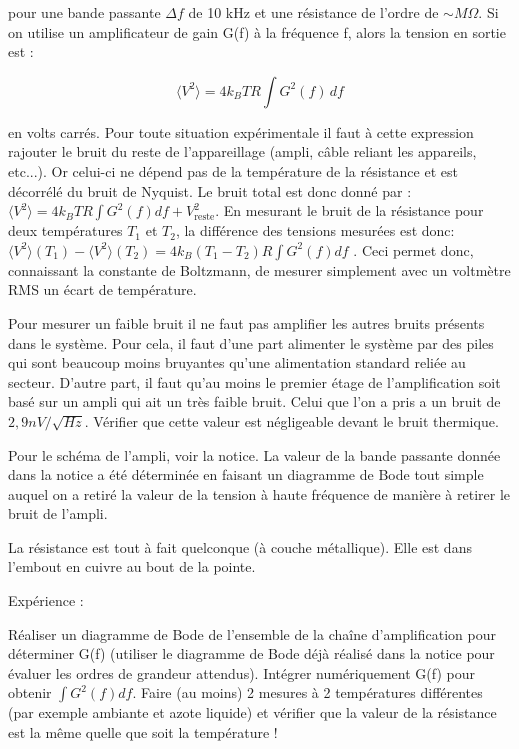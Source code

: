 \documentclass{article}%
\begin{document}
pour une bande passante $\Delta f$ de 10 kHz et une résistance de l'ordre de $\sim M\Omega$. Si on utilise un amplificateur de gain G(f) à la fréquence f, alors la tension en sortie est :

\[\langle V^2 \rangle=4k_B TR\int {G^2(f)\,{d} f}\]

en volts carrés. Pour toute situation expérimentale il faut à cette expression rajouter le bruit du reste de l'appareillage (ampli, câble reliant les appareils, etc...). Or celui-ci ne dépend pas de la température de la résistance et est décorrélé du bruit de Nyquist. Le bruit total est donc donné par : $\langle V^2\rangle = 4k_B TR\int {G^2(f) {d} f} + V_\textrm{reste}^2$. En mesurant le bruit de la résistance pour deux températures $T_1$ et $T_2$, la différence des tensions mesurées est donc: $\langle V^2 \rangle(T_1)-\langle V^2 \rangle(T_2)=4k_B (T_1-T_2)R\int {G^2(f) d f}$ . Ceci permet donc, connaissant la constante de Boltzmann, de mesurer simplement avec un voltmètre RMS un écart de température.

Pour mesurer un faible bruit il ne faut pas amplifier les autres bruits présents dans le système. Pour cela, il faut d'une part alimenter le système par des piles qui sont beaucoup moins bruyantes qu'une alimentation standard reliée au secteur. D'autre part, il faut qu'au moins le premier étage de l'amplification soit basé sur un ampli qui ait un très faible bruit. Celui que l'on a pris a un bruit de $2,9 nV/\sqrt{Hz}$. Vérifier que cette valeur est négligeable devant le bruit thermique.

Pour le schéma de l'ampli, voir la notice. La valeur de la bande passante donnée dans la notice a été déterminée en faisant un diagramme de Bode tout simple auquel on a retiré la valeur de la tension à haute fréquence de manière à retirer le bruit de l'ampli.

La résistance est tout à fait quelconque (à couche métallique). Elle est dans l'embout en cuivre au bout de la pointe.

Expérience :

    Réaliser un diagramme de Bode de l'ensemble de la chaîne d'amplification pour déterminer G(f) (utiliser le diagramme de Bode déjà réalisé dans la notice pour évaluer les ordres de grandeur attendus).
    Intégrer numériquement G(f) pour obtenir $\int G^2(f) df$.
    Faire (au moins) 2 mesures à 2 températures différentes (par exemple ambiante et azote liquide) et vérifier que la valeur de la résistance est la même quelle que soit la température !
\end{document}
